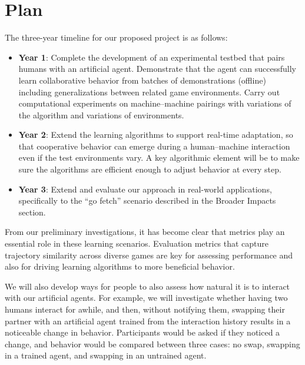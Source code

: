 
\section{Plan}
The three-year timeline for our proposed project is as follows:

\begin{itemize}
\item {\bf Year 1}: Complete the development of an experimental
  testbed that pairs humans with an artificial agent.  Demonstrate
  that the agent can successfully learn collaborative behavior from
  batches of demonstrations (offline) including generalizations
  between related game environments. Carry out computational
  experiments on machine--machine pairings with variations of the
  algorithm and variations of environments.

\item {\bf Year 2}: Extend the learning algorithms to support
  real-time adaptation, so that cooperative behavior can emerge during
  a human--machine interaction even if the test environments vary. A
  key algorithmic element will be to make sure the algorithms are
  efficient enough to adjust behavior at every step.


\item {\bf Year 3}: Extend and evaluate our approach in real-world
  applications, specifically to the ``go fetch'' scenario described in
  the Broader Impacts section. %

\end{itemize}

From our preliminary investigations, it has become clear that metrics
play an essential role in these learning scenarios.  Evaluation
metrics that capture trajectory similarity across diverse games are
key for assessing performance and also for driving learning algorithms
to more beneficial behavior. 

We will also develop ways for people to also assess how natural it is
to interact with our artificial agents. For example, we will
investigate whether having two humans interact for awhile, and then,
without notifying them, swapping their partner with an artificial
agent trained from the interaction history results in a noticeable
change in behavior. Participants would be asked if they noticed a
change, and behavior would be compared between three cases: no swap,
swapping in a trained agent, and swapping in an untrained agent.

